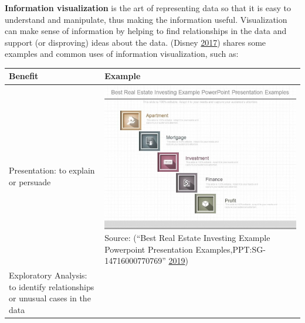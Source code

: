 \documentclass[]{book}
\begin{document}
\textbf{Information visualization} is the art of representing data so that it is easy to understand and manipulate, thus making the information useful. Visualization can make sense of information by helping to find relationships in the data and support (or disproving) ideas about the data. (Disney \protect\hyperlink{ref-lawfraud}{2017}) shares some examples and common uses of information visualization, such as:

\begin{longtable}[]{@{}ll@{}}
\toprule
\begin{minipage}[b]{0.40\columnwidth}\raggedright
Benefit\strut
\end{minipage} & \begin{minipage}[b]{0.54\columnwidth}\raggedright
Example\strut
\end{minipage}\tabularnewline
\midrule
\endhead
\begin{minipage}[t]{0.40\columnwidth}\raggedright
Presentation: to explain or persuade\strut
\end{minipage} & \begin{minipage}[t]{0.54\columnwidth}\raggedright
\includegraphics{images/Presentation.jpg} Source: (``Best Real Estate Investing Example Powerpoint Presentation Examples,PPT:SG-14716000770769'' \protect\hyperlink{ref-slide_geeks}{2019})\strut
\end{minipage}\tabularnewline
\begin{minipage}[t]{0.40\columnwidth}\raggedright
Exploratory Analysis: to identify relationships or unusual cases in the data\strut
\end{minipage} & \begin{minipage}[t]{0.54\columnwidth}\raggedright

\end{minipage}
\end{longtable}
\end{document}
